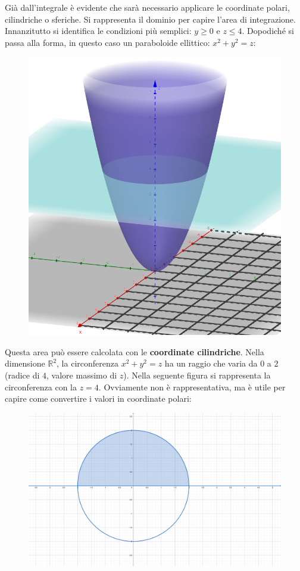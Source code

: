 \documentclass[a4paper]{article}
\begin{document}
	\noindent
	Già dall'integrale è evidente che sarà necessario applicare le coordinate polari, cilindriche o sferiche. Si rappresenta il dominio per capire l'area di integrazione. Innanzitutto si identifica le condizioni più semplici: $y \ge 0$ e $z \le 4$. Dopodiché si passa alla forma, in questo caso un paraboloide ellittico: $x^{2}+y^{2} = z$:
	\begin{figure}[!htp]
		\centering
		\includegraphics[width=.6\textwidth]{img/exercise/2023-09-06-A-ex7.png}
	\end{figure}

	\noindent
	Questa area può essere calcolata con le \textbf{coordinate cilindriche}. Nella dimensione $\mathbb{R}^{2}$, la circonferenza $x^{2}+y^{2}=z$ ha un raggio che varia da $0$ a $2$ (radice di $4$, valore massimo di $z$). Nella seguente figura si rappresenta la circonferenza con la $z=4$. Ovviamente non è rappresentativa, ma è utile per capire come convertire i valori in coordinate polari:\newpage

	\begin{figure}[!htp]
		\centering
		\includegraphics[width=.6\textwidth]{img/exercise/2023-09-06-A-ex7_2.pdf}
	\end{figure}
\end{document}
